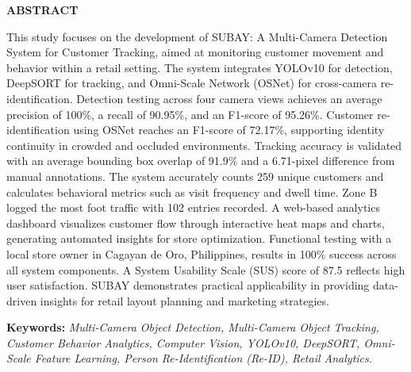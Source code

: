 \begin{center}
{\bf ABSTRACT}\\[36pt]
\end{center}
{\baselineskip

This study focuses on the development of SUBAY: A Multi-Camera Detection System for Customer Tracking, aimed at monitoring customer movement and behavior within a retail setting. The system integrates YOLOv10 for detection, DeepSORT for tracking, and Omni-Scale Network (OSNet) for cross-camera re-identification. Detection testing across four camera views achieves an average precision of 100\%, a recall of 90.95\%, and an F1-score of 95.26\%. Customer re-identification using OSNet reaches an F1-score of 72.17\%, supporting identity continuity in crowded and occluded environments. Tracking accuracy is validated with an average bounding box overlap of 91.9\% and a 6.71-pixel difference from manual annotations. The system accurately counts 259 unique customers and calculates behavioral metrics such as visit frequency and dwell time. Zone B logged the most foot traffic with 102 entries recorded. A web-based analytics dashboard visualizes customer flow through interactive heat maps and charts, generating automated insights for store optimization. Functional testing with a local store owner in Cagayan de Oro, Philippines, results in 100\% success across all system components. A System Usability Scale (SUS) score of 87.5 reflects high user satisfaction. SUBAY demonstrates practical applicability in providing data-driven insights for retail layout planning and marketing strategies.

}
\bigskip
\parbox{\textwidth}{
	\textbf{Keywords:} \textit{Multi-Camera Object Detection, Multi-Camera Object Tracking, Customer Behavior Analytics, Computer Vision, YOLOv10, DeepSORT, Omni-Scale Feature Learning, Person Re-Identification (Re-ID), Retail Analytics.}
}

